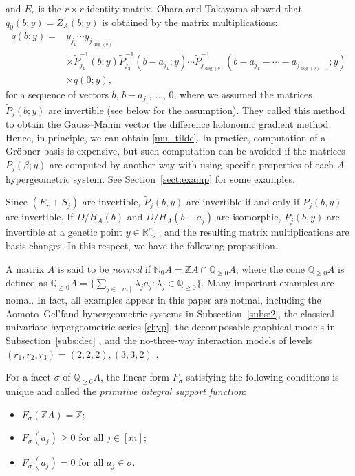 \documentclass[a4paper,12pt]{article}
\theoremstyle{plain}
\theoremstyle{remark}
\begin{document}
and $E_r$ is the $r\times r$ identity matrix.
Ohara and Takayama \cite{OT15} showed that $q_0(b;y)=Z_A(b;y)$
is obtained by the matrix multiplications:
\begin{align}
  q(b;y)=&y_{j_1}\cdots y_{j_{\deg(b)}}\nonumber\\
  &\times
  \tilde{P}_{j_1}^{-1}(b;y)\tilde{P}^{-1}_{j_2}(b-a_{j_1};y)\cdots
  \tilde{P}^{-1}_{j_{\deg(b)}}(b-a_{j_1}-\cdots-a_{j_{\deg(b)-1}};y)
  \nonumber\\
  &\times q(0;y),
  \label{recQ}  
\end{align}
for a sequence of vectors $b$, $b-a_{j_1}$, $\ldots$, $0$,
where we assumed the matrices $\tilde{P}_j(b;y)$ are invertible
(see below for the assumption). They
called this method to obtain the Gauss--Manin vector
the difference holonomic gradient method. Hence, in principle,
we can obtain \eqref{mu_tilde}.
In practice, computation of a Gr\"obner basis is
expensive, but such computation can be avoided if the matrices
$P_j(\beta;y)$ are computed by another way with
using specific properties of each $A$-hypergeometric system.
See Section~\ref{sect:examp} for some examples.

Since $(E_r+S_j)$ are invertible, $\tilde{P}_j(b,y)$ are
invertible if and only if $P_j(b,y)$ are invertible.
If $D/H_A(b)$ and $D/H_A(b-a_j)$ are isomorphic,
$P_j(b,y)$ are invertible at a genetic point $y\in\mathbb{R}^m_{>0}$
and the resulting matrix multiplications are basis changes.
In this respect, we have the following proposition.

A matrix $A$ is said to be {\it normal} if
$\mathbb{N}_0A=\mathbb{Z}A\cap\mathbb{Q}_{\ge 0}A$, where
the cone $\mathbb{Q}_{\ge 0}A$ is defined as
$\mathbb{Q}_{\ge 0}A=\{\sum_{j\in [m]}\lambda_j a_j:\lambda_j\in\mathbb{Q}_{\ge 0}\}$.
Many important examples are nomal. In fact, all examples appear
in this paper are notmal, including the Aomoto--Gel'fand
hypergeometric systems in Subsection~\ref{subs:2}, the classical
univariate hypergeometric series \eqref{chyp}, the decomposable
graphical models in Subsection~\ref{subs:dec} \cite[Corollary 4.25] {HS02},
and the no-three-way interaction models of levels
$(r_1,r_2,r_3)=(2,2,2), (3,3,2)$ \cite[Theorem 2.2] {BHI11}.

For a facet $\sigma$ of $\mathbb{Q}_{\ge 0}A$, the linear form
$F_\sigma$ satisfying the following conditions is unique and
called the {\it primitive integral support function}:

\begin{itemize}

\item[(i)] $F_\sigma(\mathbb{Z}A)=\mathbb{Z}$;

\item[(ii)] $F_\sigma(a_j)\ge 0$ for all $j\in[m]$;

\item[(iii)] $F_\sigma(a_j)=0$ for all $a_j\in\sigma$.

\end{itemize}  
  
\end{document}
